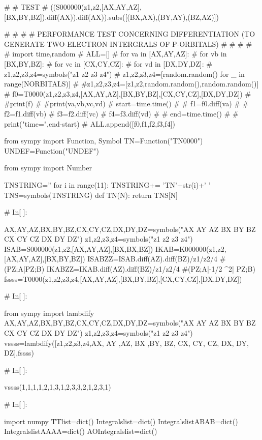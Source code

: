 #
# TEST
#
((S000000(z1,z2,[AX,AY,AZ],[BX,BY,BZ]).diff(AX)).diff(AX)).subs([(BX,AX),(BY,AY),(BZ,AZ)])


# #
# # PERFORMANCE TEST CONCERNING DIFFERENTIATION (TO GENERATE TWO-ELECTRON INTERGRALS OF P-ORBITALS)
# #
# #
# import time,random
# ALL=[]
# for va in [AX,AY,AZ]:
#     for vb in [BX,BY,BZ]:
#         for vc in [CX,CY,CZ]:
#             for vd in [DX,DY,DZ]:
#                 z1,z2,z3,z4=symbols("z1 z2 z3 z4")
#                 z1,z2,z3,z4=[random.random() for _ in range(NORBITALS)]
#                 #z1,z2,z3,z4=[z1,z2,random.random(),random.random()]
#                 f0=T0000(z1,z2,z3,z4,[AX,AY,AZ],[BX,BY,BZ],[CX,CY,CZ],[DX,DY,DZ])
#                 #print(f)
#                 #print(va,vb,vc,vd)
#                 start=time.time()
# 
#                 f1=f0.diff(va)
#                 
#                 f2=f1.diff(vb)
#                 f3=f2.diff(vc)
#                 f4=f3.diff(vd)
#                 
#                 end=time.time()
# 
#                 print("time=",end-start)
#                 ALL.append([f0,f1,f2,f3,f4])




from sympy import Function, Symbol
TN=Function("TN0000")
UNDEF=Function("UNDEF")

from sympy import Number


TNSTRING=''
for i in range(11):
    TNSTRING+= 'TN'+str(i)+' '
TNS=symbols(TNSTRING)
def TN(N):
    return TNS[N]



     


# In[ ]:


AX,AY,AZ,BX,BY,BZ,CX,CY,CZ,DX,DY,DZ=symbols("AX AY AZ BX BY BZ CX CY CZ DX DY DZ")
z1,z2,z3,z4=symbols("z1 z2 z3 z4")
ISAB=S000000(z1,z2,[AX,AY,AZ],[BX,BX,BZ])
IKAB=K000000(z1,z2,[AX,AY,AZ],[BX,BY,BZ])
ISABZZ=ISAB.diff(AZ).diff(BZ)/z1/z2/4 #(PZ;A|PZ;B)
IKABZZ=IKAB.diff(AZ).diff(BZ)/z1/z2/4 #(PZ;A|-1/2 \nabra^2| PZ;B)
fssss=T0000(z1,z2,z3,z4,[AX,AY,AZ],[BX,BY,BZ],[CX,CY,CZ],[DX,DY,DZ])


# In[ ]:


from sympy import lambdify
AX,AY,AZ,BX,BY,BZ,CX,CY,CZ,DX,DY,DZ=symbols("AX AY AZ BX BY BZ CX CY CZ DX DY DZ")
z1,z2,z3,z4=symbols("z1 z2 z3 z4")
vssss=lambdify([z1,z2,z3,z4,AX, AY ,AZ, BX ,BY, BZ, CX, CY, CZ, DX, DY, DZ],fssss)


# In[ ]:


vssss(1,1,1,1,2,1,3,1,2,3,3,2,1,2,3,1)


# In[ ]:


import numpy
TTlist=dict()
Integralslist=dict()
IntegralslistABAB=dict()
IntegralslistAAAA=dict()
AOIntegralslist=dict()


